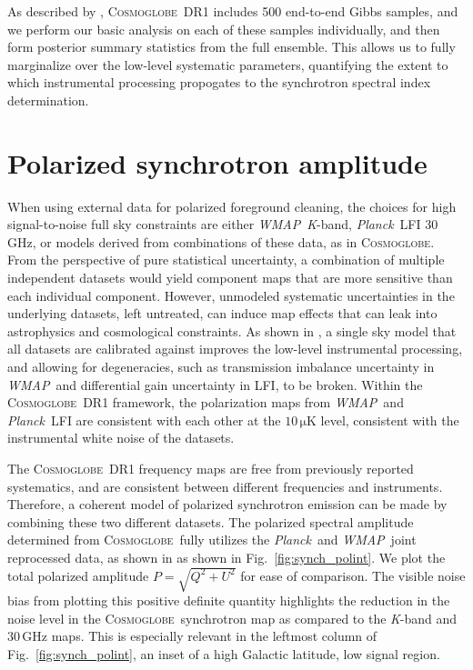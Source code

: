 \documentclass[twocolumn]{../../common/aa}
\def\WMAP{\emph{WMAP}}
\def\Planck{\emph{Planck}}
\newcommand{\cosmoglobe}{\textsc{Cosmoglobe}}
\newcommand{\K}[0]{\textit K}
\begin{document}
As described by \citet{watts2023_dr1}, \cosmoglobe\ DR1 includes 500 end-to-end Gibbs samples, and we perform our basic analysis on each of these samples individually, and then form posterior summary statistics from the full ensemble. This allows us to fully marginalize over the low-level systematic parameters, quantifying the extent to which instrumental processing propogates to the synchrotron spectral index determination.


\section{Polarized synchrotron amplitude}
\label{sec:pol_amp}




When using external data for polarized foreground cleaning, the choices for high signal-to-noise full sky constraints are either \WMAP\ \K-band, \Planck\ LFI 30\,GHz, or models derived from combinations of these data, as in \cosmoglobe. From the perspective of pure statistical uncertainty, a combination of multiple independent datasets would yield component maps that are more sensitive than each individual component. However, unmodeled systematic uncertainties in the underlying datasets, left untreated, can induce map effects that can leak into astrophysics and cosmological constraints.
As shown in \citet{watts2023_dr1}, a single sky model that all datasets are calibrated against improves the low-level instrumental processing, and allowing for degeneracies, such as transmission imbalance uncertainty in \WMAP\ and differential gain uncertainty in LFI, to be broken. Within the \cosmoglobe\ DR1 framework, the polarization maps from \WMAP\ and \Planck\ LFI are consistent with each other at the $10\,\mathrm{\mu K}$ level, consistent with the instrumental white noise of the datasets.

The \cosmoglobe\ DR1 frequency maps are free from previously reported systematics, and are consistent between different frequencies and instruments. Therefore, a coherent model of polarized synchrotron emission can be made by combining these two different datasets.
The polarized spectral amplitude determined from \cosmoglobe\ fully utilizes the \Planck\ and \WMAP\ joint reprocessed data, as shown in as shown in Fig.~\ref{fig:synch_polint}. 
We plot the total polarized amplitude $P=\sqrt{Q^2+U^2}$ for ease of comparison. The visible noise bias from plotting this positive definite quantity highlights the reduction in the noise level in the \cosmoglobe\ synchrotron map as compared to the \K-band and 30\,GHz maps. This is especially relevant in the leftmost column of Fig.~\ref{fig:synch_polint}, an inset of a high Galactic latitude, low signal region.
\end{document}
